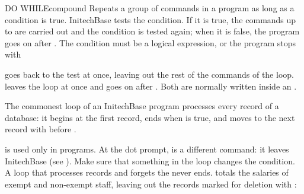 \begin{XbaseEntry}{DO WHILE}{compound}
%
Repeats a group of commands in a program as long as a condition is true.
\Syntax
{}
\Usage
InitechBase tests the condition.  If it is true, the commands up to
 are carried out and the condition is tested again; when it is
false, the program goes on after .  The condition must be a logical
expression, or the program stops with 

 goes back to the test at once, leaving out the rest of the commands
of the loop.   leaves the loop at once and goes on after
.  Both are normally written inside an .

The commonest loop of an InitechBase program processes every record of a
database: it begins at the first record, ends when  is true, and
moves to the next record with  before .

 is used only in programs.  At the dot prompt,  is a
different command: it leaves InitechBase (see ).
\Tips
Make sure that something in the loop changes the condition.  A loop that
processes records and forgets the  never ends.
\Examples
{} totals the salaries of exempt and non-exempt staff,
leaving out the records marked for deletion with :
\end{XbaseEntry}
